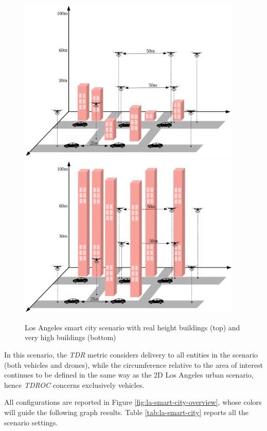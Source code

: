 		\begin{figure}[H]
			\centering
			\includegraphics[width=0.95\textwidth]{immagini/la-smart-city-low}
			\includegraphics[width=0.95\textwidth]{immagini/la-smart-city-high}
			\caption{Los Angeles smart city scenario with real height buildings (top) and very high buildings (bottom)}
			\label{fig:la-smart-city}
		\end{figure}
		\newpage
		
		In this scenario, the \textit{TDR} metric considers delivery to all entities in the scenario (both vehicles and drones), while the circumference relative to the area of interest continues to be defined in the same way as the 2D Los Angeles urban scenario, hence \textit{TDROC} concerns exclusively vehicles.
		
		
		All configurations are reported in Figure \ref{fig:la-smart-city-overview}, whose colors will guide the following graph results. Table \ref{tab:la-smart-city} reports all the scenario settings.
		
